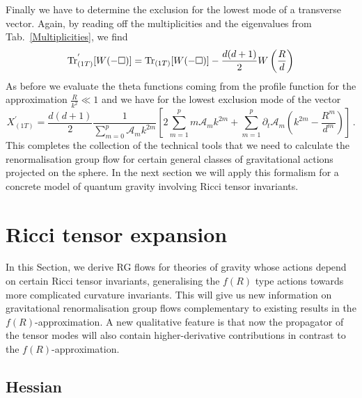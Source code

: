 \documentclass[notitlepage,eqsecnum,bm,amsmath,preprintnumbers,superscriptaddress,nofootinbib,aps,11pt]{revtex4-1}
\begin{document}
Finally we have to determine the exclusion for the lowest mode of a transverse vector. Again, by reading off the multiplicities and the eigenvalues from Tab.~\ref{Multiplicities}, we find
\begin{equation}
\textnormal{Tr}_{(1T)}^{'}[W(-\Box)]=\textnormal{Tr}_{(1T)}[W(-\Box)]-\frac{d(d+1)}{2}W\left(\frac{R}{d}\right)
\end{equation}
As before we evaluate the theta functions coming from the profile function for the approximation  $\frac{R}{k^2}\ll 1$ and we have for the lowest exclusion mode of the vector
\begin{equation}
X^{'}_{(1T)}=\frac{d(d+1)}{2}\frac{1}{\sum_{m=0}^{p}\mathcal{A}_mk^{2m}}\left[2\sum_{m=1}^{p}m\mathcal{A}_mk^{2m}+\sum_{m=1}^{p}\partial_t\mathcal{A}_m\left(k^{2m}-\frac{R^m}{d^m}\right)\right]\,.
\end{equation}
This completes the collection of the technical tools that we need to calculate the renormalisation group flow for certain general classes of gravitational actions projected 
on the sphere. In the next section we will apply this formalism for a concrete model of quantum gravity involving Ricci tensor invariants.


\section{\bf Ricci tensor expansion}
\label{SecRmunu}

In this Section, we derive RG flows for theories of gravity whose actions depend on certain Ricci tensor invariants, generalising the $f(R)$ type actions towards more complicated curvature invariants. 
This will give us new information on gravitational renormalisation group flows complementary to existing results in the $f(R)$-approximation.
A new qualitative feature is that now the propagator of the tensor modes will also contain higher-derivative contributions in contrast to the $f(R)$-approximation.


\subsection{Hessian}
\end{document}
